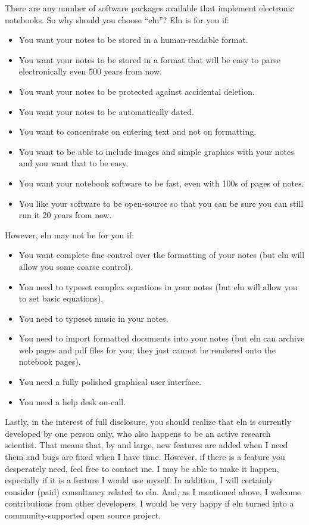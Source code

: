 \documentclass[11pt]{report}
\begin{document}
There are any
number of software packages available that implement electronic
notebooks. So why should you choose ``eln''? Eln is for you if:
\begin{itemize}
  \item You want your notes to be stored in a human-readable format.
  \item You want your notes to be stored in a format that will be easy to
    parse electronically even 500 years from now.
  \item You want your notes to be protected against accidental
    deletion.
  \item You want your notes to be automatically dated.
  \item You want to concentrate on entering text and not on
    formatting.
  \item You want to be able to include images and simple graphics with
    your notes and you want that to be easy.
  \item You want your notebook software to be fast, even with 100s
    of pages of notes.
  \item You like your software to be open-source so that you can be
    sure you can still run it 20 years from now.
\end{itemize}
\noindent However, eln may not be for you if:
\begin{itemize}
  \item You want complete fine control over the formatting of your notes
    (but eln will allow you some coarse control).
  \item You need to typeset complex equations in your notes (but eln
    will allow you to set basic equations).
  \item You need to typeset music in your notes.
  \item You need to import formatted documents into your notes (but
    eln can archive web pages and pdf files for you; they just cannot
    be rendered onto the notebook pages).
  \item You need a fully polished graphical user interface.
  \item You need a help desk on-call.
\end{itemize}
\noindent Lastly, in the interest of full disclosure, you should
realize that eln is currently developed by one person only, who also
happens to be an active research scientist. That means that, by and
large, new features are added when I need them and bugs are fixed when
I have time. However, if there is a feature you desperately need, feel
free to contact me. I may be able to make it happen, especially if it
is a feature I would use myself. In addition, I will certainly
consider (paid) consultancy related to eln. And, as I mentioned above,
I welcome contributions from other developers. I would be very happy
if eln turned into a community-supported open source project.
\end{document}
